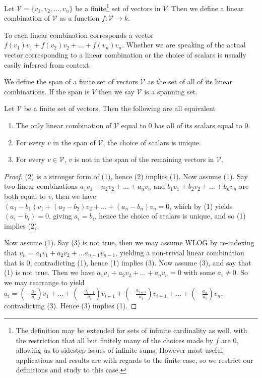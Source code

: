\documentclass[]{article}
\begin{document}
\begin{defi} 
		Let $\mathcal{V} = \{v_1, v_2, \ldots, v_n\}$ be a finite\footnote{\label{infinite-linear-combinations} The definition may be extended for sets of infinite cardinality as well, with the restriction that all but finitely many of the choices made by $f$ are $0$, allowing us to sidestep issues of infinite sums. However most useful applications and results are with regards to the finite case, so we restrict our definitions and study to this case.} set of vectors in $V$. Then we define a linear combination of $\mathcal{V}$ as a function $f: \mathcal{V} \to k$. 

		To each linear combination corresponds a vector $f(v_1) v_1 + f(v_2) v_2 + \ldots + f(v_n) v_n$. Whether we are speaking of the actual vector corresponding to a linear combination or the choice of scalars is usually easily inferred from context.
\end{defi}

\begin{defi} [Span]
		We define the span of a finite set of vectors $\mathcal{V}$ as the set of all of its linear combinations. If the span is $V$ then we say $\mathcal{V}$ is a spanning set.
\end{defi}

\begin{thm} \label{thm:equiv-lin-ind}
		Let $\mathcal{V}$ be a finite set of vectors. Then the following are all equivalent
		\begin{enumerate}
				\item The only linear combination of $\mathcal{V}$ equal to $0$ has all of its scalars equal to $0$.
				\item For every $v$ in the span of $\mathcal{V}$, the choice of scalars is unique.
				\item For every $v \in \mathcal{V}$, $v$ is not in the span of the remaining vectors in $\mathcal{V}$.
		\end{enumerate}
\end{thm}

\begin{proof}
		(2) is a stronger form of (1), hence (2) implies (1). Now assume (1). Say two linear combinations $a_1 v_1 + a_2 v_2 + \ldots + a_n v_n$ and $b_1 v_1 + b_2 v_2 + \ldots + b_n v_n$ are both equal to $v$, then we have $(a_1 - b_1) v_1 + (a_2 - b_2) v_2 + \ldots + (a_n - b_n) v_n = 0$, which by (1) yields $(a_i - b_i) = 0$, giving $a_i = b_i$, hence the choice of scalars is unique, and so (1) implies (2).

		Now assume (1). Say (3) is not true, then we may assume WLOG by re-indexing that $v_n = a_1 v_1 + a_2 v_2 + \ldots a_{n-1} v_{n-1}$, yielding a non-trivial linear combination that is $0$, contradicting (1), hence (1) implies (3). Now assume (3), and say that (1) is not true. Then we have $a_1 v_1 + a_2 v_2 + \ldots + a_n v_n = 0$ with some $a_i \neq 0$. So we may rearrange to yield $a_i = (-\frac{a_1}{a_i}) v_1 + \ldots + (-\frac{a_{i-1}}{a_i}) v_{i-1} + (-\frac{a_{i+1}}{a_i}) v_{i+1} + \ldots + (-\frac{a_n}{a_i}) v_n$, contradicting (3). Hence (3) implies (1).
\end{proof}
\end{document}
